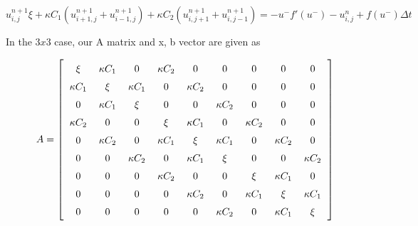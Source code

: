 \documentclass[norsk,a4paper,12pt]{scrartcl}
\begin{document}
\begin{equation*}
    u_{i,j}^{n+1}\xi + \kappa C_1(u_{i+1,j}^{n+1} + u_{i-1,j}^{n+1}) + \kappa C_2(u_{i,j+1}^{n+1} + u_{i,j-1}^{n+1}) = -u^-f'(u^-) - u_{i,j}^n + f(u^-)\Delta t
\end{equation*}

In the $3x3$ case, our A matrix and x, b vector are given as 

\begin{align*}
  \renewcommand{\arraystretch}{1.5}
  \setlength{\arraycolsep}{6pt}
  A=\left[\begin{array}{ccccccccc}
\xi & \kappa C_1 & 0 & \kappa C_2 & 0 & 0 & 0 & 0 & 0 \\
\kappa C_1 & \xi & \kappa C_1 & 0 & \kappa C_2 & 0 & 0 & 0 & 0 \\
0 & \kappa C_1 & \xi & 0 & 0 & \kappa C_2 & 0 & 0 & 0 \\
\kappa C_2 & 0 & 0 & \xi & \kappa C_1 & 0 & \kappa C_2 & 0 & 0 \\
0 & \kappa C_2 & 0 & \kappa C_1 & \xi & \kappa C_1 & 0 & \kappa C_2 & 0 \\
0 & 0 & \kappa C_2 & 0 & \kappa C_1 & \xi& 0 & 0 & \kappa C_2 \\
0 & 0 & 0 & \kappa C_2 & 0 & 0 & \xi & \kappa C_1 & 0 \\
0 & 0 & 0 & 0 & \kappa C_2 & 0 & \kappa C_1 & \xi & \kappa C_1 \\
0 & 0 & 0 & 0 & 0 & \kappa C_2 & 0 & \kappa C_1 & \xi
\end{array}\right]
\end{align*}
\end{document}
